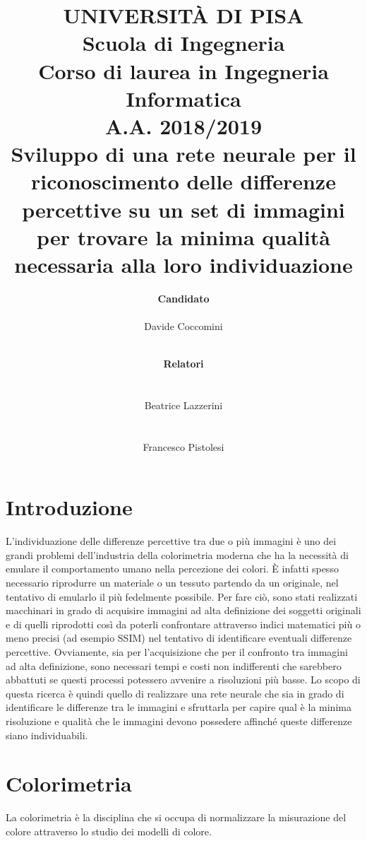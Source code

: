 \documentclass[a4paper,11pt]{article}
\author{
        \rule{0in}{0pt}\textbf{\Large Candidato} \\
        \rule{0in}{0pt}Davide Coccomini \\
        \and
        \rule{1.5in}{0pt}\textbf{\Large Relatori}\\
        \rule{1.5in}{0pt}Beatrice Lazzerini\\
        \rule{1.5in}{0pt}Francesco Pistolesi \\
    }
\title{\textbf{UNIVERSITÀ DI PISA} \\[0.4in]
    Scuola di Ingegneria \\
    Corso di laurea in Ingegneria Informatica \\
    A.A. 2018/2019\\[0.7in]
    Sviluppo di una rete neurale per il riconoscimento delle differenze
    percettive su un set di immagini per trovare la minima qualità
    necessaria alla loro individuazione \\[0.8in]}
\date{}
\begin{document}
    \pagestyle{fancy}
    \fancyhead{} 
    \renewcommand{\headrulewidth}{0pt}
    \fancyfoot{}
    \fancyfoot[LE,RO]{\thepage}    
    \renewcommand{\footrulewidth}{0.4pt}
    \maketitle
    \newpage
        \tableofcontents
        \newpage
        \section{Introduzione}
        L'individuazione delle differenze percettive tra due o più immagini è uno dei grandi problemi dell'industria della colorimetria moderna che ha la necessità di emulare il 
        comportamento umano nella percezione dei colori. È infatti spesso necessario riprodurre un materiale o un tessuto partendo da un originale, nel tentativo di emularlo il più fedelmente possibile. 
        Per fare ciò, sono stati realizzati macchinari in grado di acquisire immagini ad alta definizione dei soggetti originali e di quelli riprodotti così da poterli confrontare attraverso indici matematici più o meno precisi (ad esempio SSIM) 
        nel tentativo di identificare eventuali differenze percettive. Ovviamente, sia per l'acquisizione che per il confronto tra immagini ad alta definizione, sono necessari tempi e costi non indifferenti che sarebbero abbattuti se questi processi potessero avvenire a risoluzioni più basse.
        Lo scopo di questa ricerca è quindi quello di realizzare una rete neurale che sia in grado di identificare le differenze tra le immagini e sfruttarla per capire qual è la minima risoluzione e qualità che le immagini devono possedere affinché queste differenze siano individuabili.
    
        \newpage
        \section{Colorimetria}
        La colorimetria è la disciplina che si occupa di normalizzare la misurazione del colore attraverso lo studio dei modelli di colore.
\end{document}
